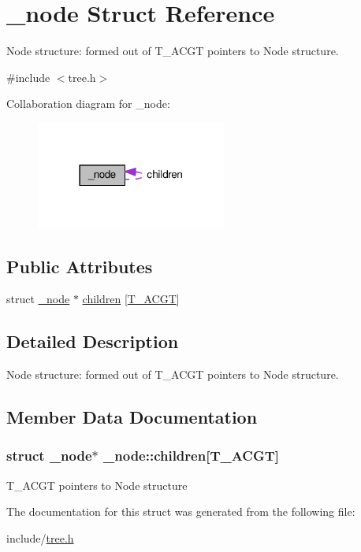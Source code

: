\hypertarget{struct__node}{\section{\+\_\+node Struct Reference}
\label{struct__node}
}


Node structure\+: formed out of T\+\_\+\+A\+C\+G\+T pointers to Node structure.  




{\ttfamily \#include $<$tree.\+h$>$}



Collaboration diagram for \+\_\+node\+:\nopagebreak
\begin{figure}[H]
\begin{center}
\leavevmode
\includegraphics[width=178pt]{struct__node__coll__graph}
\end{center}
\end{figure}
\subsection*{Public Attributes}
\begin{DoxyCompactItemize}
\item 
struct \hyperlink{struct__node}{\+\_\+node} $\ast$ \hyperlink{struct__node_a7f878e5e9c5c9d2801715c870b9bbc1c}{children} \mbox{[}\hyperlink{defines_8h_a3919067d6defd46504313402bac82d22}{T\+\_\+\+A\+C\+G\+T}\mbox{]}
\end{DoxyCompactItemize}


\subsection{Detailed Description}
Node structure\+: formed out of T\+\_\+\+A\+C\+G\+T pointers to Node structure. 

\subsection{Member Data Documentation}
\hypertarget{struct__node_a7f878e5e9c5c9d2801715c870b9bbc1c}{
\subsubsection[{children}]{\setlength{\rightskip}{0pt plus 5cm}struct {\bf \+\_\+node}$\ast$ \+\_\+node\+::children\mbox{[}{\bf T\+\_\+\+A\+C\+G\+T}\mbox{]}}}\label{struct__node_a7f878e5e9c5c9d2801715c870b9bbc1c}
T\+\_\+\+A\+C\+G\+T pointers to Node structure 

The documentation for this struct was generated from the following file\+:\begin{DoxyCompactItemize}
\item 
include/\hyperlink{tree_8h}{tree.\+h}\end{DoxyCompactItemize}
